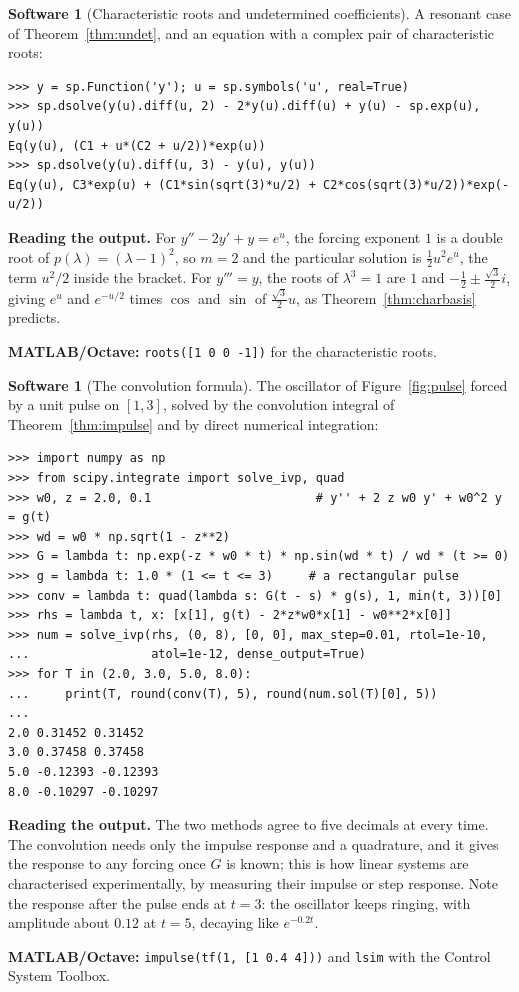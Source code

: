 \documentclass[11pt,a4paper]{article}
\numberwithin{equation}{section}
\theoremstyle{definition}
\newtheorem{software}[thm]{Software}
\begin{document}
\begin{software}[Characteristic roots and undetermined coefficients]
\label{sw:undet}
A resonant case of Theorem~\ref{thm:undet}, and an equation with a complex pair of characteristic roots:
{\small\begin{verbatim}
>>> y = sp.Function('y'); u = sp.symbols('u', real=True)
>>> sp.dsolve(y(u).diff(u, 2) - 2*y(u).diff(u) + y(u) - sp.exp(u), y(u))
Eq(y(u), (C1 + u*(C2 + u/2))*exp(u))
>>> sp.dsolve(y(u).diff(u, 3) - y(u), y(u))
Eq(y(u), C3*exp(u) + (C1*sin(sqrt(3)*u/2) + C2*cos(sqrt(3)*u/2))*exp(-u/2))
\end{verbatim}}
\textbf{Reading the output.} For $y'' - 2y' + y = e^u$, the forcing exponent $1$ is a double root of $p(\lambda) = (\lambda - 1)^2$, so $m = 2$ and the particular solution is $\frac12u^2e^u$, the term $u^2/2$
inside the bracket. For $y''' = y$, the roots of $\lambda^3 = 1$ are $1$ and $-\frac12 \pm \frac{\sqrt3}{2}i$, giving $e^u$ and $e^{-u/2}$ times $\cos$ and $\sin$ of $\frac{\sqrt3}{2}u$, as Theorem~\ref{thm:charbasis} predicts.

\textbf{MATLAB/Octave:} \texttt{roots([1 0 0 -1])} for the characteristic roots.
\end{software}

\begin{software}[The convolution formula]
\label{sw:convolution}
The oscillator of Figure~\ref{fig:pulse} forced by a unit pulse on $[1, 3]$, solved by the convolution integral of Theorem~\ref{thm:impulse} and by direct numerical integration:
{\small\begin{verbatim}
>>> import numpy as np
>>> from scipy.integrate import solve_ivp, quad
>>> w0, z = 2.0, 0.1                       # y'' + 2 z w0 y' + w0^2 y = g(t)
>>> wd = w0 * np.sqrt(1 - z**2)
>>> G = lambda t: np.exp(-z * w0 * t) * np.sin(wd * t) / wd * (t >= 0)
>>> g = lambda t: 1.0 * (1 <= t <= 3)     # a rectangular pulse
>>> conv = lambda t: quad(lambda s: G(t - s) * g(s), 1, min(t, 3))[0]
>>> rhs = lambda t, x: [x[1], g(t) - 2*z*w0*x[1] - w0**2*x[0]]
>>> num = solve_ivp(rhs, (0, 8), [0, 0], max_step=0.01, rtol=1e-10,
...                 atol=1e-12, dense_output=True)
>>> for T in (2.0, 3.0, 5.0, 8.0):
...     print(T, round(conv(T), 5), round(num.sol(T)[0], 5))
...
2.0 0.31452 0.31452
3.0 0.37458 0.37458
5.0 -0.12393 -0.12393
8.0 -0.10297 -0.10297
\end{verbatim}}
\textbf{Reading the output.} The two methods agree to five decimals at every time. The convolution needs only the impulse response and a quadrature, and it gives the response to
any forcing once $G$ is known; this is how linear systems are characterised experimentally, by measuring their impulse or step response. Note the response after the pulse ends
at $t = 3$: the oscillator keeps ringing, with amplitude about $0.12$ at $t = 5$, decaying like $e^{-0.2t}$.

\textbf{MATLAB/Octave:} \texttt{impulse(tf(1, [1 0.4 4]))} and \texttt{lsim} with the Control System Toolbox.
\end{software}
\end{document}
